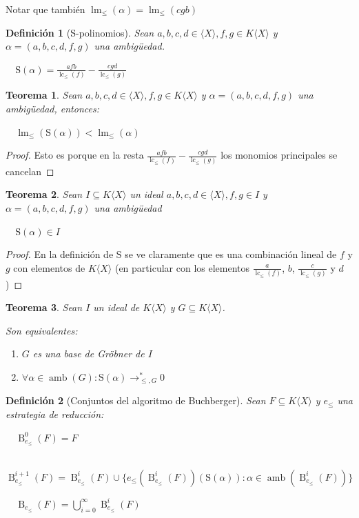 \documentclass{amsbook}
\theoremstyle{customstyle}
\newtheorem{definition}{Definición}[section]
\newtheorem{theorem}{Teorema}[section]
\DeclareMathOperator{\lm}{lm}
\DeclareMathOperator{\lc}{lc}
\DeclareMathOperator{\amb}{amb}
\renewcommand{\S}{\text{S}}
\DeclareMathOperator{\B}{B}
\begin{document}
Notar que también $\lm_≤{(α)} = \lm_≤{(cgb)}$

\begin{definition}[S-polinomios]
Sean $a, b, c, d ∈ ⟨X⟩, f, g ∈ K⟨X⟩$ y $α = (a, b, c, d, f, g)$ una ambigüedad.

  $\S(α) = \frac{afb}{\lc_≤{(f)}} - \frac{cgd}{\lc_≤{(g)}}$
\end{definition}

\begin{theorem}
Sean $a, b, c, d ∈ ⟨X⟩, f, g ∈ K⟨X⟩$ y $α = (a, b, c, d, f, g)$ una ambigüedad, entonces:

  $\lm_≤{(\S(α))} < \lm_≤{(α)}$

\end{theorem}
\begin{proof}
Esto es porque en la resta $\frac{afb}{\lc_≤{(f)}} - \frac{cgd}{\lc_≤{(g)}}$ los monomios principales se cancelan
\end{proof}

\begin{theorem}\label{thm:S es cerrado en ideal}
Sean $I ⊆ K⟨X⟩$ un ideal $a, b, c, d ∈ ⟨X⟩, f, g ∈ I$ y $α = (a, b, c, d, f, g)$ una ambigüedad

  $\S(α) ∈ I$

\end{theorem}
\begin{proof}
En la definición de $\S$ se ve claramente que es una combinación lineal de $f$ y $g$ con elementos de $K⟨X⟩$ (en particular con los elementos $\frac{a}{\lc_≤{(f)}}$, $b$, $\frac{c}{\lc_≤{(g)}}$ y $d$)
\end{proof}

\begin{theorem}\label{thm:equivalencias de base de Gröbner (con ambs)}
Sean $I$ un ideal de $K⟨X⟩$ y $G ⊆ K⟨X⟩$.

Son equivalentes:
\begin{enumerate}
\item $G$ es una base de Gröbner de $I$

\item $∀α ∈ \amb(G) : \S(α) →^*_{≤, G} 0$

\end{enumerate}
\end{theorem}


\begin{definition}[Conjuntos del algoritmo de Buchberger]
Sean $F ⊆ K⟨X⟩$ y $e_≤$ una estrategia de reducción:

  $\B_{e_≤}^0(F) = F$

  $\B_{e_≤}^{i + 1}(F) = \B_{e_≤}^i(F) ∪ \{e_≤(\B_{e_≤}^i(F))(\S(α)) : α ∈ \amb(\B_{e_≤}^i(F))\}$

  $\B_{e_≤}(F) = \bigcup_{i = 0}^∞ \B_{e_≤}^i(F)$

\end{definition}
\end{document}

